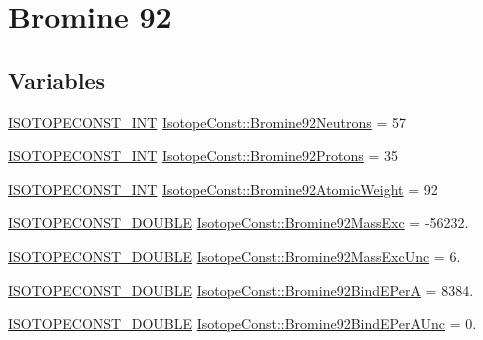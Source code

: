 \hypertarget{group___isotope_const-_bromine-_br92}{}\section{Bromine 92}
\label{group___isotope_const-_bromine-_br92}
\subsection*{Variables}
\begin{DoxyCompactItemize}
\item 
\mbox{\hyperlink{group___isotope_const-_macros_ga5f18360b3e99483a35c32d789e62621c}{I\+S\+O\+T\+O\+P\+E\+C\+O\+N\+S\+T\+\_\+\+I\+NT}} \mbox{\hyperlink{group___isotope_const-_bromine-_br92_ga543bb06e125ad852b490d8d15938c41c}{Isotope\+Const\+::\+Bromine92\+Neutrons}} = 57
\item 
\mbox{\hyperlink{group___isotope_const-_macros_ga5f18360b3e99483a35c32d789e62621c}{I\+S\+O\+T\+O\+P\+E\+C\+O\+N\+S\+T\+\_\+\+I\+NT}} \mbox{\hyperlink{group___isotope_const-_bromine-_br92_gaf3d43ff9d5e256f050353adc1338174f}{Isotope\+Const\+::\+Bromine92\+Protons}} = 35
\item 
\mbox{\hyperlink{group___isotope_const-_macros_ga5f18360b3e99483a35c32d789e62621c}{I\+S\+O\+T\+O\+P\+E\+C\+O\+N\+S\+T\+\_\+\+I\+NT}} \mbox{\hyperlink{group___isotope_const-_bromine-_br92_ga7cf7bb2a1ca628f37098c93dd0e0409b}{Isotope\+Const\+::\+Bromine92\+Atomic\+Weight}} = 92
\item 
\mbox{\hyperlink{group___isotope_const-_macros_ga8f45a7272ce02c0b4c65c44636ed719a}{I\+S\+O\+T\+O\+P\+E\+C\+O\+N\+S\+T\+\_\+\+D\+O\+U\+B\+LE}} \mbox{\hyperlink{group___isotope_const-_bromine-_br92_ga15bdd6cf1afe22c6bf5709a069200bef}{Isotope\+Const\+::\+Bromine92\+Mass\+Exc}} = -\/56232.
\item 
\mbox{\hyperlink{group___isotope_const-_macros_ga8f45a7272ce02c0b4c65c44636ed719a}{I\+S\+O\+T\+O\+P\+E\+C\+O\+N\+S\+T\+\_\+\+D\+O\+U\+B\+LE}} \mbox{\hyperlink{group___isotope_const-_bromine-_br92_ga44b2789eccd4179b75122c2829ab8f43}{Isotope\+Const\+::\+Bromine92\+Mass\+Exc\+Unc}} = 6.
\item 
\mbox{\hyperlink{group___isotope_const-_macros_ga8f45a7272ce02c0b4c65c44636ed719a}{I\+S\+O\+T\+O\+P\+E\+C\+O\+N\+S\+T\+\_\+\+D\+O\+U\+B\+LE}} \mbox{\hyperlink{group___isotope_const-_bromine-_br92_ga1220db825b913a487ac33087734d745d}{Isotope\+Const\+::\+Bromine92\+Bind\+E\+PerA}} = 8384.
\item 
\mbox{\hyperlink{group___isotope_const-_macros_ga8f45a7272ce02c0b4c65c44636ed719a}{I\+S\+O\+T\+O\+P\+E\+C\+O\+N\+S\+T\+\_\+\+D\+O\+U\+B\+LE}} \mbox{\hyperlink{group___isotope_const-_bromine-_br92_gabe39c3ff207f02f02f29f750dec25280}{Isotope\+Const\+::\+Bromine92\+Bind\+E\+Per\+A\+Unc}} = 0.

\end{DoxyCompactItemize}
